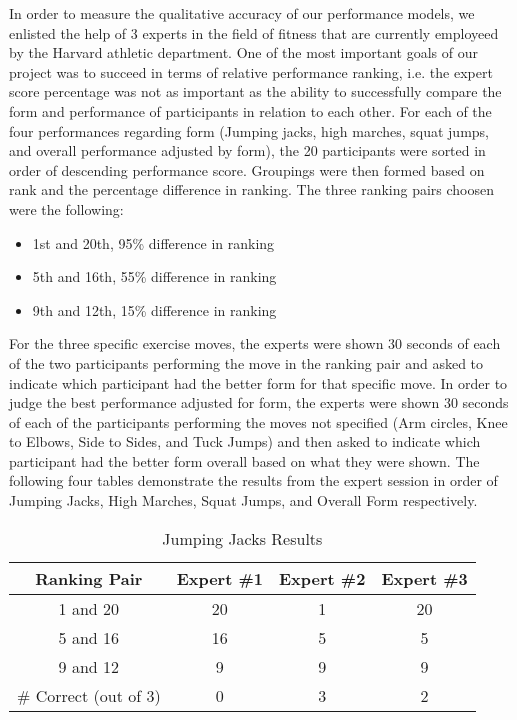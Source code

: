 In order to measure the qualitative accuracy of our performance models, we enlisted the help of 3 experts in the field of fitness that are currently employeed by the Harvard athletic department.  One of the most important goals of our project was to succeed in terms of relative performance ranking, i.e. the expert score percentage was not as important as the ability to successfully compare the form and performance of participants in relation to each other.  For each of the four performances regarding form (Jumping jacks, high marches, squat jumps, and overall performance adjusted by form), the 20 participants were sorted in order of descending performance score.  Groupings were then formed based on rank and the percentage difference  in ranking.  The three ranking pairs choosen were the following: \\
\begin{itemize}
	\item{1st and 20th, 95\% difference in ranking} \\
	\item{5th and 16th, 55\% difference in ranking} \\
	\item{9th and 12th, 15\% difference in ranking} 
\end{itemize}
For the three specific exercise moves, the experts were shown 30 seconds of each of the two participants performing the move in the ranking pair and asked to indicate which participant had the better form for that specific move.  In order to judge the best performance adjusted for form, the experts were shown 30 seconds of each of the participants performing the moves not specified (Arm circles, Knee to Elbows, Side to Sides, and Tuck Jumps) and then asked to indicate which participant had the better form overall based on what they were shown.  The following four tables demonstrate the results from the expert session in order of Jumping Jacks, High Marches, Squat Jumps, and Overall Form respectively.\\

\begin{table}[h!]
\caption{Jumping Jacks Results}
\centering
\begin{tabular}{c c c c}
\hline \hline
Ranking Pair & Expert \#1 & Expert \#2 & Expert \#3 \\ [0.5ex]
\hline
1 and 20 &		20&		1&		20 \\
5 and 16 &		16&		5&		5 \\
9 and 12 &		9&		9&		9 \\
\hline
\# Correct (out of 3)&		0&		3&		2 \\
\end{tabular}
\label{table:jumpingjacksresult}
\end{table}

